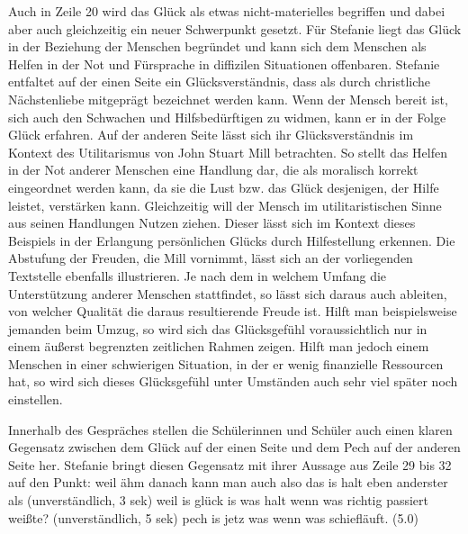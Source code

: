 Auch in Zeile 20 wird das Glück als etwas nicht-materielles begriffen und dabei aber auch gleichzeitig ein neuer Schwerpunkt gesetzt. 
Für Stefanie liegt das Glück in der Beziehung der Menschen begründet und kann sich dem Menschen als Helfen in der Not und Fürsprache in diffizilen Situationen offenbaren.
 Stefanie entfaltet auf der einen Seite ein Glücksverständnis, dass als durch christliche Nächstenliebe mitgeprägt bezeichnet werden kann. 
 Wenn der Mensch bereit ist, sich auch den Schwachen und Hilfsbedürftigen zu widmen, kann er in der Folge Glück erfahren. 
 Auf der anderen Seite lässt sich ihr Glücksverständnis im Kontext des Utilitarismus von John Stuart Mill betrachten. 
 So stellt das Helfen in der Not anderer Menschen eine Handlung dar, die als moralisch korrekt eingeordnet werden kann, da sie die Lust bzw. das Glück desjenigen, der Hilfe leistet, verstärken kann. 
 Gleichzeitig will der Mensch im utilitaristischen Sinne aus seinen Handlungen Nutzen ziehen. 
 Dieser lässt sich im Kontext dieses Beispiels in der Erlangung persönlichen Glücks durch Hilfestellung erkennen. 
 Die Abstufung der Freuden, die Mill vornimmt, lässt sich an der vorliegenden Textstelle ebenfalls illustrieren. 
 Je nach dem in welchem Umfang die Unterstützung anderer Menschen stattfindet, so lässt sich daraus auch ableiten, von welcher Qualität die daraus resultierende Freude ist. 
 Hilft man beispielsweise jemanden beim Umzug, so wird sich das Glücksgefühl voraussichtlich nur in einem äußerst begrenzten zeitlichen Rahmen zeigen. 
 Hilft man jedoch einem Menschen in einer schwierigen Situation, in der er wenig finanzielle Ressourcen hat, so wird sich dieses Glücksgefühl unter Umständen auch sehr viel später noch einstellen.
 
Innerhalb des Gespräches stellen die Schülerinnen und Schüler auch einen klaren Gegensatz zwischen dem Glück auf der einen Seite und dem Pech auf der anderen Seite her. 
Stefanie bringt diesen Gegensatz mit ihrer Aussage aus Zeile 29 bis 32 auf den Punkt:
\glqq weil ähm danach kann man auch also das is halt eben anderster als (unverständlich, 3 sek) weil is glück is was halt wenn was richtig passiert weißte? (unverständlich, 5 sek) pech is jetz was wenn was schiefläuft. (5.0)\grqq{}

